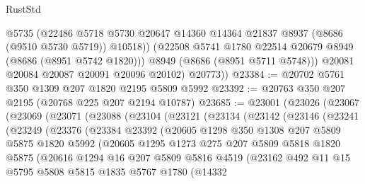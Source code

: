 \begin{lexlean}{RustStd}
\begin{coremodule}
              @5735
              (@22486
                @5718
                @5730
                @20647
                @14360
                @14364
                @21837
                @8937
                (@8686 (@9510 @5730 @5719))
                @10518))
            (@22508 @5741 @1780 @22514 @20679 @8949 (@8686 (@8951 @5742 @1820)))
            @8949
            (@8686 (@8951 @5711 @5748)))
          @20081
          @20084
          @20087
          @20091
          @20096
          @20102)
        @20773))
@23384 := @20702 @5761 @350 @1309 @207 @1820 @2195 @5809 @5992
@23392 := @20763 @350 @207 @2195 (@20768 @225 @207 @2194 @10787)
@23685 := @23001
    (@23026
      (@23067
        (@23069
          (@23071
            (@23088
              (@23104
                (@23121
                  (@23134
                    (@23142
                      (@23146
                        (@23241
                          (@23249
                            (@23376
                              (@23384
                                @23392
                                (@20605
                                  @1298
                                  @350
                                  @1308
                                  @207
                                  @5809
                                  @5875
                                  @1820
                                  @5992
                                  (@20605
                                    @1295
                                    @1273
                                    @275
                                    @207
                                    @5809
                                    @5818
                                    @1820
                                    @5875
                                    (@20616
                                      @1294
                                      @16
                                      @207
                                      @5809
                                      @5816
                                      @4519
                                      (@23162
                                        @492
                                        @11
                                        @15
                                        @5795
                                        @5808
                                        @5815
                                        @1835
                                        @5767
                                        @1780
                                        (@14332

\end{coremodule}
\end{lexlean}

